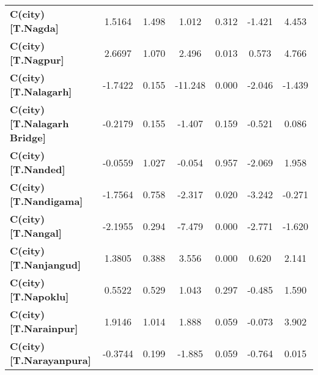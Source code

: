 \begin{center}
\begin{tabular}{lcccccc}
\textbf{C(city)[T.Nagda]}                                                                           &       1.5164  &        1.498     &     1.012  &         0.312        &       -1.421    &        4.453     \\
\textbf{C(city)[T.Nagpur]}                                                                          &       2.6697  &        1.070     &     2.496  &         0.013        &        0.573    &        4.766     \\
\textbf{C(city)[T.Nalagarh]}                                                                        &      -1.7422  &        0.155     &   -11.248  &         0.000        &       -2.046    &       -1.439     \\
\textbf{C(city)[T.Nalagarh Bridge]}                                                                 &      -0.2179  &        0.155     &    -1.407  &         0.159        &       -0.521    &        0.086     \\
\textbf{C(city)[T.Nanded]}                                                                          &      -0.0559  &        1.027     &    -0.054  &         0.957        &       -2.069    &        1.958     \\
\textbf{C(city)[T.Nandigama]}                                                                       &      -1.7564  &        0.758     &    -2.317  &         0.020        &       -3.242    &       -0.271     \\
\textbf{C(city)[T.Nangal]}                                                                          &      -2.1955  &        0.294     &    -7.479  &         0.000        &       -2.771    &       -1.620     \\
\textbf{C(city)[T.Nanjangud]}                                                                       &       1.3805  &        0.388     &     3.556  &         0.000        &        0.620    &        2.141     \\
\textbf{C(city)[T.Napoklu]}                                                                         &       0.5522  &        0.529     &     1.043  &         0.297        &       -0.485    &        1.590     \\
\textbf{C(city)[T.Narainpur]}                                                                       &       1.9146  &        1.014     &     1.888  &         0.059        &       -0.073    &        3.902     \\
\textbf{C(city)[T.Narayanpura]}                                                                     &      -0.3744  &        0.199     &    -1.885  &         0.059        &       -0.764    &        0.015     \\

\end{tabular}
\end{center}
